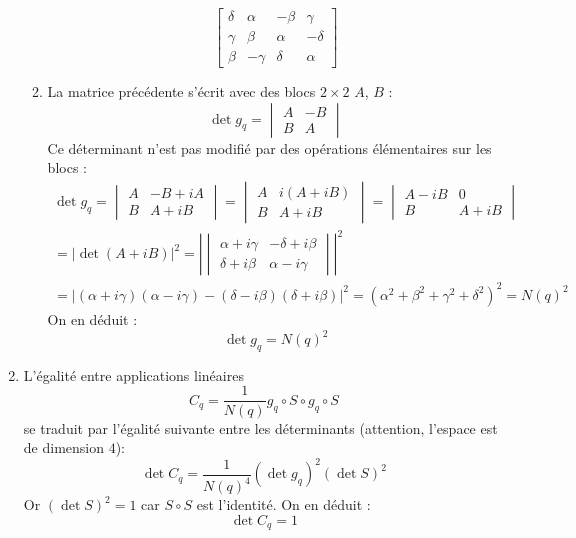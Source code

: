 \begin{enumerate}
\begin{enumerate}
\begin{displaymath}
\begin{bmatrix}
 \delta & \alpha & -\beta & \gamma \\
 \gamma & \beta & \alpha & -\delta \\
 \beta & -\gamma & \delta & \alpha
\end{bmatrix}
\end{displaymath}
\item La matrice précédente s'écrit avec des blocs $2\times 2$ $A$, $B$ :
\begin{displaymath}
 \det g_q =
\begin{vmatrix}
A  & -B \\
B  & A 
\end{vmatrix}
\end{displaymath}
Ce déterminant n'est pas modifié par des opérations élémentaires sur les blocs :
\begin{multline*}
 \det g_q =
\begin{vmatrix}
A  & -B + iA \\
B  & A + iB 
\end{vmatrix}
= \begin{vmatrix}
A  & i(A + iB) \\
B  & A + iB 
\end{vmatrix}
= \begin{vmatrix}
A - iB  & 0 \\
B  & A + iB 
\end{vmatrix}
\\
=\vert \det(A+iB)\vert ^2
= \left\vert \begin{vmatrix}
\alpha + i\gamma  & -\delta + i\beta \\
\delta + i\beta  & \alpha - i\gamma 
\end{vmatrix} \right\vert ^2 
\\
= \vert (\alpha + i\gamma)(\alpha - i\gamma)-(\delta - i\beta)(\delta + i\beta)\vert^2
=(\alpha^2 + \beta^2 + \gamma^2 + \delta^2)^2 = N(q)^2
\end{multline*}
On en déduit :
\begin{displaymath}
 \det g_q = N(q)^2
\end{displaymath}
\end{enumerate}
\item L'égalité entre applications linéaires 
\begin{displaymath}
 C_q = \dfrac{1}{N(q)} g_q \circ S \circ g_q \circ S
\end{displaymath}
se traduit par l'égalité suivante entre les déterminants (attention, l'espace est de dimension $4$):
\begin{displaymath}
 \det C_q = \dfrac{1}{N(q)^4} (\det g_q)^2 (\det S)^2
\end{displaymath}
Or $(\det S)^2=1$ car $S\circ S$ est l'identité. On en déduit :
\begin{displaymath}
 \det C_q = 1
\end{displaymath}
\end{enumerate}

